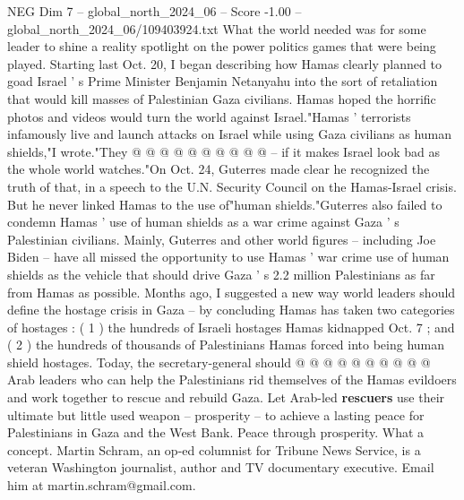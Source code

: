 \begin{textsample}{NEG Dim 7 – global\_north\_2024\_06 – Score -1.00 – global\_north\_2024\_06/109403924.txt}
What the world needed was for some leader to shine a reality spotlight on the power politics games that were being played.
Starting last Oct. 20, I began describing how Hamas clearly planned to goad Israel ' s Prime Minister Benjamin Netanyahu into the sort of retaliation that would kill masses of Palestinian Gaza civilians.
Hamas hoped the horrific photos and videos would turn the world against Israel."Hamas ' terrorists infamously live and launch attacks on Israel while using Gaza civilians as human shields,"I wrote."They @ @ @ @ @ @ @ @ @ @ -- if it makes Israel look bad as the whole world watches."On Oct. 24, Guterres made clear he recognized the truth of that, in a speech to the U.N.
Security Council on the Hamas-Israel crisis.
But he never linked Hamas to the use of"human shields."Guterres also failed to condemn Hamas ' use of human shields as a war crime against Gaza ' s Palestinian civilians.
Mainly, Guterres and other world figures -- including Joe Biden -- have all missed the opportunity to use Hamas ' war crime use of human shields as the vehicle that should drive Gaza ' s 2.2 million Palestinians as far from Hamas as possible.
Months ago, I suggested a new way world leaders should define the hostage crisis in Gaza -- by concluding Hamas has taken two categories of hostages : ( 1 ) the hundreds of Israeli hostages Hamas kidnapped Oct. 7 ; and ( 2 ) the hundreds of thousands of Palestinians Hamas forced into being human shield hostages.
Today, the secretary-general should @ @ @ @ @ @ @ @ @ @ Arab leaders who can help the Palestinians rid themselves of the Hamas evildoers and work together to rescue and rebuild Gaza.
Let Arab-led \textbf{rescuers} use their ultimate but little used weapon -- prosperity -- to achieve a lasting peace for Palestinians in Gaza and the West Bank.
Peace through prosperity.
What a concept.
Martin Schram, an op-ed columnist for Tribune News Service, is a veteran Washington journalist, author and TV documentary executive.
Email him at martin.schram@gmail.com.

\end{textsample}
